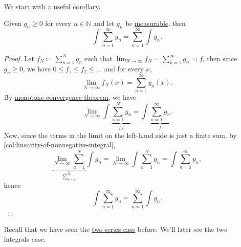 We start with a useful corollary.

\begin{corollary}\label{col:Tonelli-theorem-for-nonnegative-series-and-integrals}
	Given \(g_{n}\geq 0\) for every \(n\in\mathbb{N} \) and let \(g_{n}\) be \hyperref[def:measurable-function]{measurable}, then
	\[
		\int \sum_{n=1}^{\infty} g_{n} = \sum_{n=1}^{\infty} \int g_{n}.
	\]
\end{corollary}
\begin{proof}
	Let \(f_{N} \coloneqq \sum_{n=1}^{N} g_{n}\) such that \(\lim_{N \to \infty} f_{N} = \sum_{n=1}^{\infty} g_{n} \eqqcolon f\), then since \(g_{n}\geq 0\), we have \(0\leq f_{1}\leq f_{2}\leq \dots \) and for every \(x\),
	\[
		\lim_{N \to \infty} f_{N}(x) = \sum_{n=1}^{\infty} g_{n}(x).
	\]
	By \hyperref[thm:MCT]{monotone convergence theorem}, we have
	\[
		\lim_{N \to \infty} \int \underbrace{\sum_{n=1}^N g_{n}}_{f_{N}} = \int \underbrace{\sum_{n=1}^{\infty} g_{n }}_{f}.
	\]
	Now, since the terms in the limit on the left-hand side is just a finite sum, by \autoref{col:linearity-of-nonnegative-integral},
	\[
		\underbrace{\lim_{N \to \infty} \sum_{n=1}^{N}}_{\sum_{n=1}^{\infty} } \int g_{n} =\lim_{N \to \infty} \int \sum_{n=1}^N g_{n} = \int \sum_{n=1}^{\infty} g_{n},
	\]
	hence
	\[
		\int \sum_{n=1}^{\infty} g_{n} = \sum_{n=1}^{\infty} \int g_{n}.
	\]
\end{proof}

\begin{remark}
	Recall that we have seen the \hyperref[thm:Tonelli-for-series]{two series case} before. We'll later see the two integrals case.
\end{remark}

